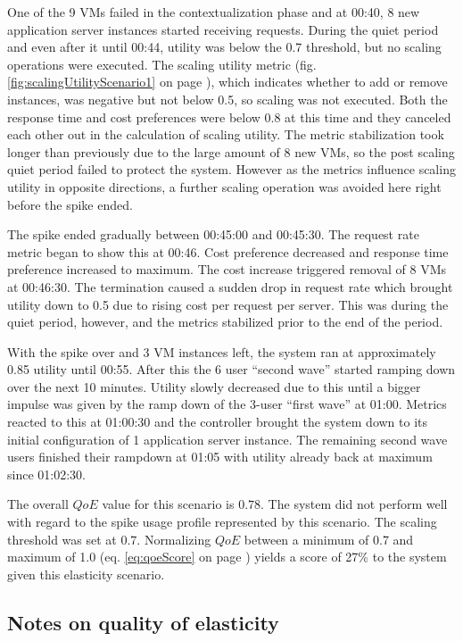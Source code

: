 \documentclass[english]{tktltiki2}
\theoremstyle{definition}
\theoremstyle{remark}
\begin{document}
One of the 9 VMs failed in the contextualization phase and at 00:40, 8 new
application server instances started receiving requests. During the quiet period
and even after it until 00:44, utility was below the 0.7 threshold, but no
scaling operations were executed. The scaling utility metric (fig.
\ref{fig:scalingUtilityScenario1} on page
\pageref{fig:scalingUtilityScenario1}), which indicates whether to add or remove
instances, was negative but not below 0.5, so scaling was not executed. Both the
response time and cost preferences were below 0.8 at this time and they canceled
each other out in the calculation of scaling utility. The metric stabilization
took longer than previously due to the large amount of 8 new VMs, so the post
scaling quiet period failed to protect the system. However as the metrics
influence scaling utility in opposite directions, a further scaling operation
was avoided here right before the spike ended.

The spike ended gradually between 00:45:00 and 00:45:30. The request rate
metric began to show this at 00:46. Cost preference decreased and response time
preference increased to maximum. The cost increase triggered removal of 8 VMs at
00:46:30. The termination caused a sudden drop in request rate which brought
utility down to 0.5 due to rising cost per request per server. This was during
the quiet period, however, and the metrics stabilized prior to the end of the
period.

With the spike over and 3 VM instances left, the system ran at approximately
0.85 utility until 00:55. After this the 6 user ``second wave'' started ramping
down over the next 10 minutes. Utility slowly decreased due to this until a
bigger impulse was given by the ramp down of the 3-user ``first wave'' at 01:00.
Metrics reacted to this at 01:00:30 and the controller brought the system down
to its initial configuration of 1 application server instance. The remaining
second wave users finished their rampdown at 01:05 with utility already back at
maximum since 01:02:30.

The overall $QoE$ value for this scenario is $0.78$. The system did not perform
well with regard to the spike usage profile represented by this scenario. The
scaling threshold was set at $0.7$. Normalizing $QoE$ between a minimum of 0.7
and maximum of 1.0 (eq. \ref{eq:qoeScore} on page \pageref{eq:qoeScore}) yields
a score of 27\% to the system given this elasticity scenario.

\subsection{Notes on quality of elasticity}
\end{document}
